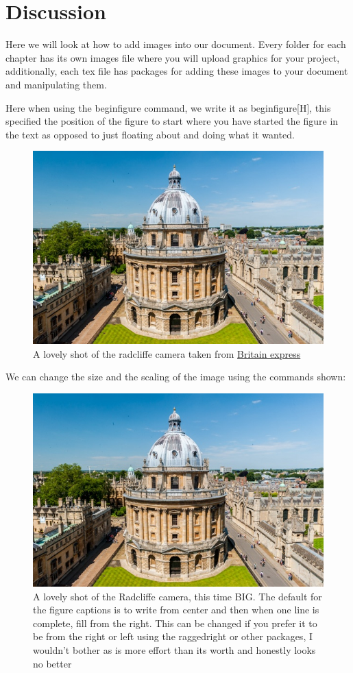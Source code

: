 \documentclass[../main.tex]{subfiles}
\begin{document}
\section{Discussion}

Here we will look at how to add images into our document. Every folder for each chapter has its own images file where you will upload graphics for your project, additionally, each tex file has packages for adding these images to your document and manipulating them. 

Here when using the begin{figure} command, we write it as begin{figure}[H], this specified the position of the figure to start where you have started the figure in the text as opposed to just floating about and doing what it wanted.

\begin{figure}[H]
    \centering
    \includegraphics[width=0.5\linewidth]{Chapter5/images/Radcliffe-Camera-8163.jpg}
    \caption{A lovely shot of the radcliffe camera taken from 
    \href{https://www.britainexpress.com/cities/oxford/radcliffe.htm}{Britain express}}
    \label{fig:enter-label}
\end{figure}

We can change the size and the scaling of the image using the commands shown:

\begin{figure}[H]
    \centering
    \includegraphics[width=0.9\linewidth]{Chapter5/images/Radcliffe-Camera-8163.jpg}
    \caption{A lovely shot of the Radcliffe camera, this time BIG. The default for the figure captions is to write from center and then when one line is complete, fill from the right. This can be changed if you prefer it to be from the right or left using the raggedright or other packages, I wouldn't bother as is more effort than its worth and honestly looks no better}
    \label{fig:enter-label}
\end{figure}
\end{document}
